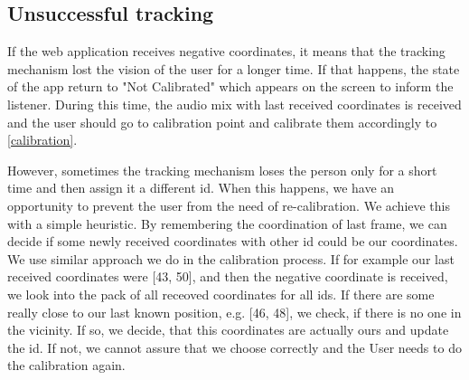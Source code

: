 \documentclass{ctuthesis}
\begin{document}
\subsection{Unsuccessful tracking}
If the web application receives negative coordinates, it means that the tracking mechanism lost the vision of the user for a longer time. If that happens, the state of the app return to "Not Calibrated" which appears on the screen to inform the listener. During this time, the audio mix with last received coordinates is received and the user should go to calibration point and calibrate them accordingly to \ref{calibration}.

However, sometimes the tracking mechanism loses the person only for a short time and then assign it a different id. When this happens, we have an opportunity to prevent the user from the need of re-calibration. We achieve this with a simple heuristic. By remembering the coordination of last frame, we can decide if some newly received coordinates with other id could be our coordinates. We use similar approach we do in the calibration process. If for example our last received coordinates were [43, 50], and then the negative coordinate is received, we look into the pack of all receoved coordinates for all ids. If there are some really close to our last known position, e.g. [46, 48], we check, if there is no one in the vicinity. If so, we decide, that this coordinates are actually ours and update the id. If not, we cannot assure that we choose correctly and the User needs to do the calibration again.
\end{document}
